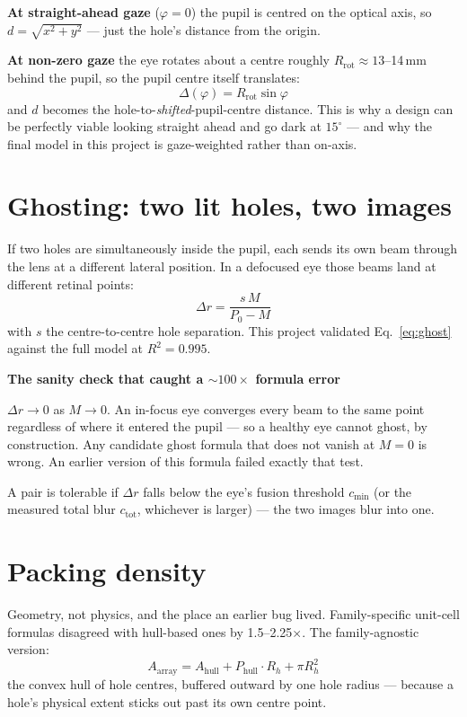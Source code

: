 \documentclass[11pt]{report}
\newenvironment{keybox}[1]%
{\par\vspace{8pt}\begin{lrbox}{\kbsave}\begin{minipage}{0.88\textwidth}%
{\bfseries\color{hbblue}#1}\par\vspace{4pt}\ignorespaces}%
{\end{minipage}\end{lrbox}%
\begin{center}\setlength{\fboxrule}{1.2pt}\setlength{\fboxsep}{8pt}%
\fcolorbox{hbblue}{boxgrey}{\usebox{\kbsave}}\end{center}\vspace{8pt}\par}
\begin{document}
\textbf{At straight-ahead gaze} ($\varphi=0$) the pupil is centred on the optical axis, so
$d = \sqrt{x^2+y^2}$ --- just the hole's distance from the origin.

\textbf{At non-zero gaze} the eye rotates about a centre roughly $R_{\text{rot}} \approx 13$--14\,mm
behind the pupil, so the pupil centre itself translates:
\begin{equation}
\Delta(\varphi) = R_{\text{rot}}\sin\varphi
\label{eq:gazeshift}
\end{equation}
and $d$ becomes the hole-to-\emph{shifted}-pupil-centre distance. This is why a design can be
perfectly viable looking straight ahead and go dark at $15^\circ$ --- and why the final model in
this project is gaze-weighted rather than on-axis.

\section{Ghosting: two lit holes, two images}

If two holes are simultaneously inside the pupil, each sends its own beam through the lens at a
different lateral position. In a defocused eye those beams land at different retinal points:
\begin{equation}
\Delta r = \frac{s\,M}{P_0-M}
\label{eq:ghost}
\end{equation}
with $s$ the centre-to-centre hole separation. This project validated Eq.~\ref{eq:ghost} against
the full model at $R^2 = 0.995$.

\begin{keybox}{The sanity check that caught a $\sim100\times$ formula error}
$\Delta r \to 0$ as $M \to 0$. An in-focus eye converges every beam to the same point regardless
of where it entered the pupil --- so a healthy eye cannot ghost, by construction. Any candidate
ghost formula that does not vanish at $M=0$ is wrong. An earlier version of this formula failed
exactly that test.
\end{keybox}

A pair is tolerable if $\Delta r$ falls below the eye's fusion threshold $c_{\min}$ (or the
measured total blur $c_{\text{tot}}$, whichever is larger) --- the two images blur into one.

\section{Packing density}

Geometry, not physics, and the place an earlier bug lived. Family-specific unit-cell formulas
disagreed with hull-based ones by 1.5--2.25$\times$. The family-agnostic version:
\begin{equation}
A_{\text{array}} = A_{\text{hull}} + P_{\text{hull}}\cdot R_h + \pi R_h^2
\label{eq:density}
\end{equation}
the convex hull of hole centres, buffered outward by one hole radius --- because a hole's
physical extent sticks out past its own centre point.
\end{document}
